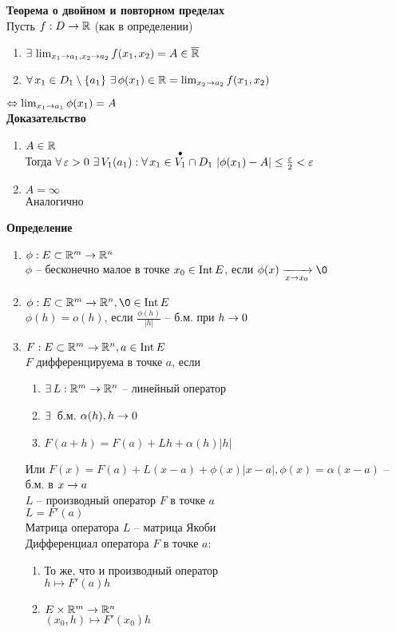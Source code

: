 \documentclass[12pt]{article}
\begin{document}
\textbf{Теорема о двойном и повторном пределах}\\
Пусть $f: D \rightarrow \mathbb{R}$ (как в определении)
\begin{enumerate}
    \item $\exists\, \lim_{x_1\rightarrow a_1, x_2 \rightarrow a_2} f(x_1, x_2) = A \in \overline{\mathbb{R}}$
    \item $\fall x_1 \in D_1\setminus \{a_1\}\ \ex \phi(x_1) \in \Rset = \lim_{x_2 \rto a_2} f(x_1, x_2)$
\end{enumerate}
$\Leftrightarrow \lim_{x_1 \rightarrow a_1} \phi(x_1) = A$\\
\textbf{Доказательство}
\begin{enumerate}
    \item $A \in \mathbb{R}$\\
    Тогда $\forall\, \varepsilon > 0\ \exists\, V_1(a_1): \forall\, x_1 \in \overset{\bullet}{V_1}\cap D_1\ |\phi(x_1) - A| \leq \frac{\varepsilon}2 < \varepsilon$
    \item $A = \infty$\\
    Аналогично
\end{enumerate}
\textbf{Определение}
\begin{enumerate}
    \item $\phi: E \subset \mathbb{R}^m \rightarrow \mathbb{R}^n$\\
    $\phi$ -- бесконечно малое в точке $x_0 \in \operatorname{Int} E$, если $\phi(x) \xrto[x\rto x_0]{} \0$\\
    \item $\phi: E \subset \Rset^m \rto \Rset^n, \0 \in \nm{Int} E$\\
    $\phi(h) = o(h)$, если $\frac{\phi(h)}{|h|}$ -- б.м. при $h\rightarrow 0$
    \item $F: E\subset \mathbb{R}^m \rightarrow \mathbb{R}^n, a \in \operatorname{Int} E$\\
    $F$ дифференцируема в точке $a$, если
    \begin{enumerate}
        \item $\exists\, L: \mathbb{R}^m \rightarrow \mathbb{R}^n$ -- линейный оператор
        \item $\exists\,$ б.м. $\alpha(h), h \rightarrow 0$
        \item $F(a + h) = F(a) + Lh + \alpha(h)|h|$
    \end{enumerate}
    Или $F(x) = F(a) + L(x-a) + \phi(x)|x-a|, \phi(x) = \alpha(x-a)$ -- б.м. в $x\rightarrow a$\\
    $L$ -- производный оператор $F$ в точке $a$\\
    $L = F'(a)$\\
    Матрица оператора $L$ -- матрица Якоби\\
    Дифференциал оператора $F$ в точке $a$:
    \begin{enumerate}
        \item То же, что и производный оператор\\
        $h\mapsto F'(a) h$
        \item $E \times \mathbb{R}^m \rightarrow \mathbb{R}^n$\\
        $(x_0, h) \mapsto F'(x_0)h$
    \end{enumerate}
\end{enumerate}
\end{document}
